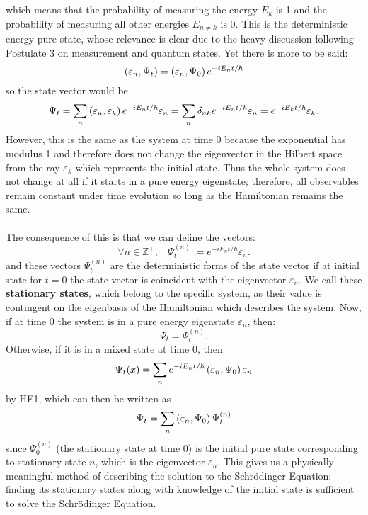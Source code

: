\begin{enumerate}
$$    $$
    which means that the probability of measuring the energy $E_{k}$ is 1 and the probability of measuring all other energies $E_{n\neq k}$ is 0. This is the deterministic energy pure state, whose relevance is clear due to the heavy discussion following Postulate 3 on measurement and quantum states. Yet there is more to be said:
    $$
   \left(\varepsilon_{n},\Psi_{t}\right)=\left(\varepsilon_{n},\Psi_{0}\right)e^{-{iE_{n}t}/{\hbar}}
    $$
    so the state vector would be
    $$
    \Psi_{t}=\sum_{n}\left(\varepsilon_{n},\varepsilon_{k}\right)e^{-{iE_{n}t}/{\hbar}}\varepsilon_{n}=\sum_{n}\delta_{nk}e^{-{iE_{n}t}/{\hbar}}\varepsilon_{n}=e^{-{iE_{k}t}/{\hbar}}\varepsilon_{k}.
    $$
    However, this is the same as the system at time $0$ because the exponential has modulus 1 and therefore does not change the eigenvector in the Hilbert space from the ray
    $\varepsilon_{k}$ which represents the initial state. Thus the whole system does not change at all if it starts in a pure energy eigenstate; therefore, all observables remain constant under time evolution so long as the Hamiltonian remains the same.
    \\\\
    The consequence of this is that we can define the vectors:
    $$
    \forall n\in\mathbb{Z}^+,\:\:\:\:\Psi_{t}^{(n)}:=e^{-iE_{n}t/\hbar}\varepsilon_{n}.
    $$
    and these vectors $\Psi_{t}^{(n)}$ are the deterministic forms of the state vector if at initial state for $t=0$ the state vector is coincident with the eigenvector $\varepsilon_{n}$. We call these \textbf{stationary states}, which belong to the specific system, as their value is contingent on the eigenbasis of the Hamiltonian which describes the system. Now, if at time 0 the system is in a pure energy eigenstate $\varepsilon_{n}$, then:
    $$
    \Psi_{t}=\Psi_{t}^{(n)}.
    $$
    Otherwise, if it is in a mixed state at time 0, then 
    $$
    \Psi_{t}(x)=\sum_{n}e^{-iE_{n}t/\hbar}\left(\varepsilon_{n},\Psi_{0}\right)\varepsilon_{n}
    $$
    by HE1, which can then be written as
    $$
    \Psi_{t}=\sum_{n}\left(\varepsilon_{n},\Psi_{0}\right)\Psi_{t}^{(n)}
    $$
    since $\Psi_{0}^{(n)}$ (the stationary state at time $0$) is the initial pure state corresponding to stationary state $n$, which is the eigenvector $\varepsilon_{n}$. This gives us a physically meaningful method of describing the solution to the Schr\"{o}dinger Equation: finding its stationary states along with knowledge of the initial state is sufficient to solve the Schr\"{o}dinger Equation. 

\end{enumerate}
